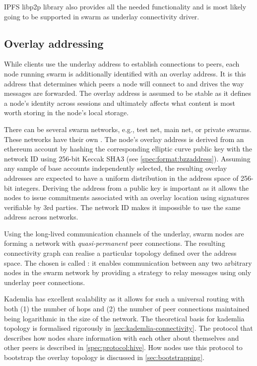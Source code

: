 IPFS libp2p library also provides all the needed functionality and is most likely going to be supported in swarm as underlay connectivity driver.

\subsection{Overlay addressing}\label{sec:overlay-addressing} 


While clients use the underlay address to establish connections to peers, each node running swarm is additionally identified with an overlay address. It is this address that determines which peers a node will connect to and drives the way messages are forwarded. The overlay address is assumed to be stable as it defines a node's identity across sessions and ultimately affects what content is most worth storing in the node's local storage.

There can be several swarm networks, e.g., test net, main net, or private swarms. These networks have their own . The node's overlay address is derived from an ethereum account by hashing the corresponding elliptic curve public key with the network ID using 256-bit Keccak SHA3 (see \ref{spec:format:bzzaddress}). Assuming any sample of base accounts independently selected, the resulting overlay addresses are expected to have a uniform distribution in the address space of 256-bit integers.  Deriving the address from a public key is important as it allows the nodes to issue commitments associated with an overlay location using signatures verifiable by 3rd parties. The network ID makes it impossible to use the same address across networks.

Using the long-lived communication channels of the underlay, swarm nodes are forming a network with \emph{quasi-permanent} peer connections. The resulting connectivity graph can realise a particular topology defined over the address space. The  chosen is called : it enables communication between any two arbitrary nodes in the swarm network by providing a strategy to relay messages using only underlay peer connections. 

Kademlia has excellent scalability as it allows for such a universal routing with both (1) the number of hops and (2) the number of peer connections maintained being logarithmic in the size of the network. The  theoretical basis for kademlia topology is formalised rigorously in \ref{sec:kademlia-connectivity}. The protocol that describes how nodes share information with each other about themselves and other peers is described in \ref{spec:protocol:hive}. How nodes use this protocol to bootstrap the overlay topology is discussed in \ref{sec:bootstrapping}.


